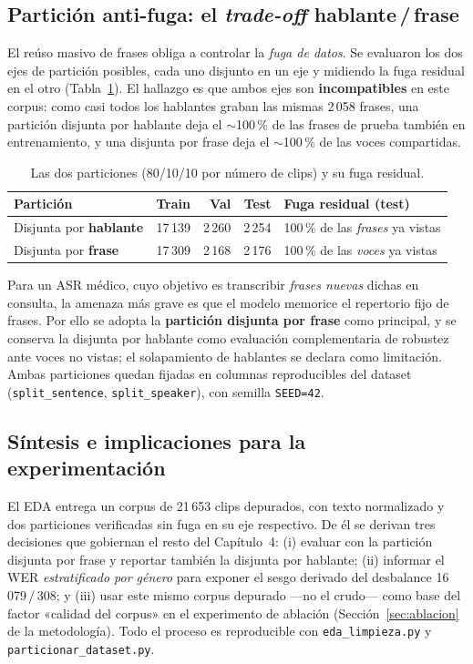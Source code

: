 \subsection{Partición anti-fuga: el \emph{trade-off} hablante\,/\,frase}
\label{sec:eda-particion}

El reúso masivo de frases obliga a controlar la \emph{fuga de datos}. Se evaluaron los dos
ejes de partición posibles, cada uno disjunto en un eje y midiendo la fuga residual en el
otro (Tabla~\ref{tab:particion}). El hallazgo es que ambos ejes son
\textbf{incompatibles} en este corpus: como casi todos los hablantes graban las mismas
2\,058 frases, una partición disjunta por hablante deja el $\sim$100\,\% de las frases de
prueba también en entrenamiento, y una disjunta por frase deja el $\sim$100\,\% de las
voces compartidas.

\begin{table}[H]
  \centering
  \small
  \caption{Las dos particiones (80/10/10 por número de clips) y su fuga residual.}
  \label{tab:particion}
  \begin{tabularx}{\linewidth}{@{}l r r r X@{}}
    \toprule
    Partición & Train & Val & Test & Fuga residual (test) \\
    \midrule
    Disjunta por \textbf{hablante} & 17\,139 & 2\,260 & 2\,254 & 100\,\% de las \emph{frases} ya vistas \\
    Disjunta por \textbf{frase}    & 17\,309 & 2\,168 & 2\,176 & 100\,\% de las \emph{voces} ya vistas \\
    \bottomrule
  \end{tabularx}
\end{table}

Para un ASR médico, cuyo objetivo es transcribir \emph{frases nuevas} dichas en consulta,
la amenaza más grave es que el modelo memorice el repertorio fijo de frases. Por ello se
adopta la \textbf{partición disjunta por frase} como principal, y se conserva la disjunta
por hablante como evaluación complementaria de robustez ante voces no vistas; el
solapamiento de hablantes se declara como limitación. Ambas particiones quedan fijadas en
columnas reproducibles del dataset (\texttt{split\_sentence}, \texttt{split\_speaker}),
con semilla \texttt{SEED=42}.

\subsection{Síntesis e implicaciones para la experimentación}
\label{sec:eda-sintesis}

El EDA entrega un corpus de 21\,653 clips depurados, con texto normalizado y dos
particiones verificadas sin fuga en su eje respectivo. De él se derivan tres decisiones
que gobiernan el resto del Capítulo~4: (i) evaluar con la partición disjunta por frase y
reportar también la disjunta por hablante; (ii) informar el WER \emph{estratificado por
género} para exponer el sesgo derivado del desbalance 16\,079\,/\,308; y (iii) usar este
mismo corpus depurado —no el crudo— como base del factor «calidad del corpus» en el
experimento de ablación (Sección~\ref{sec:ablacion} de la metodología). Todo el proceso es
reproducible con \texttt{eda\_limpieza.py} y \texttt{particionar\_dataset.py}.
